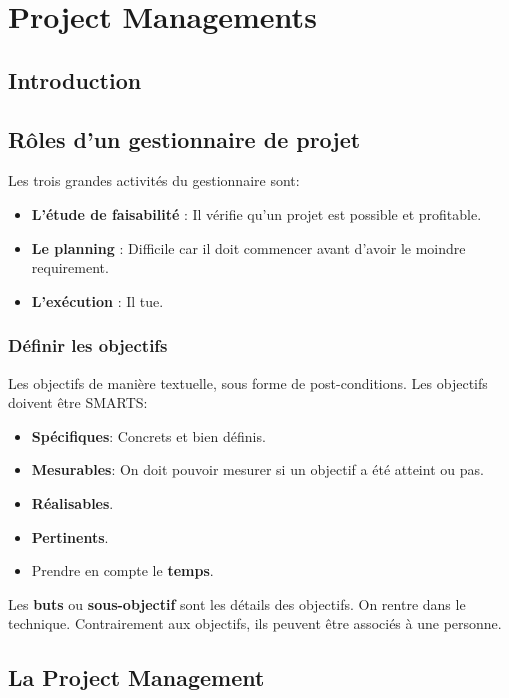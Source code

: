 \section{Project Managements}



\subsection{Introduction}



\subsection{Rôles d'un gestionnaire de projet}
Les trois grandes activités du gestionnaire sont:
\begin{itemize}
    \item \textbf{L’étude de faisabilité} : Il vérifie qu’un projet est possible et profitable.
    \item \textbf{Le planning} : Difficile car il doit commencer avant d’avoir le moindre requirement.
    \item \textbf{L’exécution} : Il tue.
\end{itemize}



\subsubsection{Définir les objectifs}
Les objectifs de manière textuelle, sous forme de post-conditions.
Les objectifs doivent être SMARTS:
\begin{itemize}
    \item \textbf{Spécifiques}: Concrets et bien définis.
    \item \textbf{Mesurables}: On doit pouvoir mesurer si un objectif a été atteint ou pas.
    \item \textbf{Réalisables}.
    \item \textbf{Pertinents}.
    \item Prendre en compte le \textbf{temps}.
\end{itemize}
Les \textbf{buts} ou \textbf{sous-objectif} sont les détails des objectifs. On rentre dans le technique. Contrairement aux objectifs, ils peuvent être associés à une personne.



\subsection{La Project Management}



